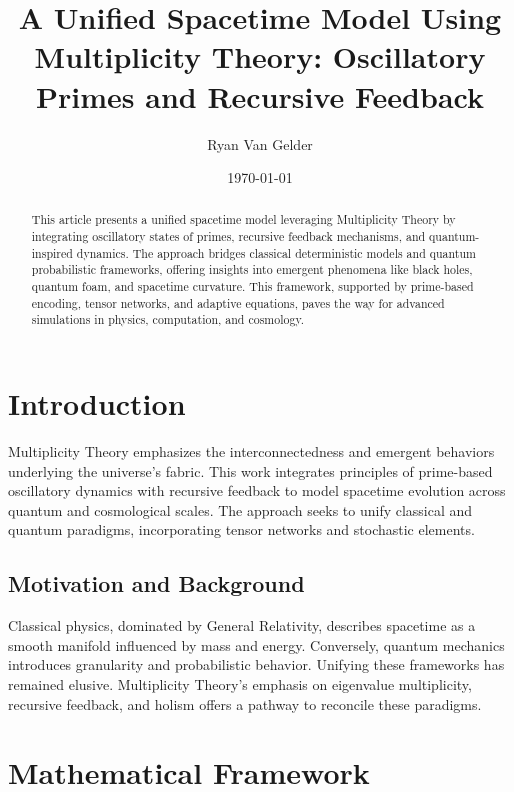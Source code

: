 \documentclass{article}
\theoremstyle{plain}
\begin{document}
\title{A Unified Spacetime Model Using Multiplicity Theory: Oscillatory Primes and Recursive Feedback}

\author{Ryan Van Gelder}
\date{\today}
\maketitle

\begin{abstract}
This article presents a unified spacetime model leveraging Multiplicity Theory by integrating oscillatory states of primes, recursive feedback mechanisms, and quantum-inspired dynamics. The approach bridges classical deterministic models and quantum probabilistic frameworks, offering insights into emergent phenomena like black holes, quantum foam, and spacetime curvature. This framework, supported by prime-based encoding, tensor networks, and adaptive equations, paves the way for advanced simulations in physics, computation, and cosmology.
\end{abstract}

\section{Introduction}
Multiplicity Theory emphasizes the interconnectedness and emergent behaviors underlying the universe's fabric. This work integrates principles of prime-based oscillatory dynamics with recursive feedback to model spacetime evolution across quantum and cosmological scales. The approach seeks to unify classical and quantum paradigms, incorporating tensor networks and stochastic elements.

\subsection{Motivation and Background}
Classical physics, dominated by General Relativity, describes spacetime as a smooth manifold influenced by mass and energy. Conversely, quantum mechanics introduces granularity and probabilistic behavior. Unifying these frameworks has remained elusive. Multiplicity Theory's emphasis on eigenvalue multiplicity, recursive feedback, and holism offers a pathway to reconcile these paradigms.

\section{Mathematical Framework}
\end{document}

